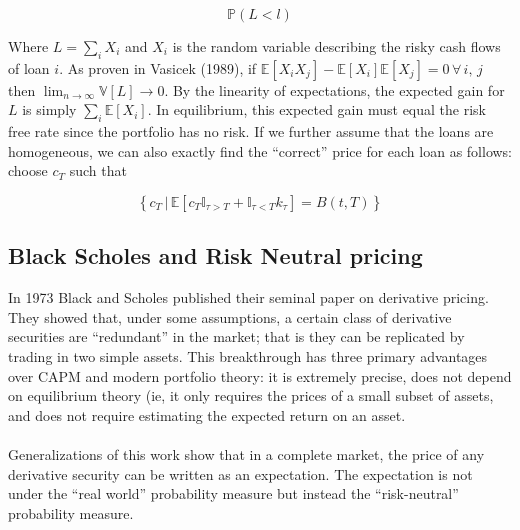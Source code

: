 \documentclass{article}
\theoremstyle{definition}
\begin{document}
\begin{equation}
\mathbb{P}(L<l)
\end{equation}

Where \(L=\sum_i X_i \) and \(X_i\) is the random variable describing the risky cash flows of loan \(i\).  As proven in Vasicek (1989), if \(\mathbb{E}[X_iX_j]-\mathbb{E}[X_i]\mathbb{E}[X_j]=0\,\forall\,i,\,j\) then \( \lim_{n \to \infty}\mathbb{V}[L] \to 0\).  By the linearity of expectations, the expected gain for \(L\) is simply \(\sum_i \mathbb{E}[X_i]\).  In equilibrium, this expected gain must equal the risk free rate since the portfolio has no risk.  If we further assume that the loans are homogeneous, we can also exactly find the ``correct'' price for each loan as follows: choose \(c_T\) such that

\[
\left\{c_T \,|\, \mathbb{E}\left[ c_T \mathbb{I}_{\tau>T}+\mathbb{I}_{\tau<T} k_\tau \right]=B(t, T)\right\}
\]

\subsection{Black Scholes and Risk Neutral pricing}

In 1973 Black and Scholes published their seminal paper on derivative pricing.  They showed that, under some assumptions, a certain class of derivative securities are ``redundant'' in the market; that is they can be replicated by trading in two simple assets.  This breakthrough has three primary advantages over CAPM and modern portfolio theory: it is extremely precise, does not depend on equilibrium theory (ie, it only requires the prices of a small subset of assets, and does not require estimating the expected return on an asset.  
\\
\\
Generalizations of this work show that in a complete market, the price of any derivative security can be written as an expectation.  The expectation is not under the ``real world'' probability measure but instead the ``risk-neutral'' probability measure.  
\end{document}
